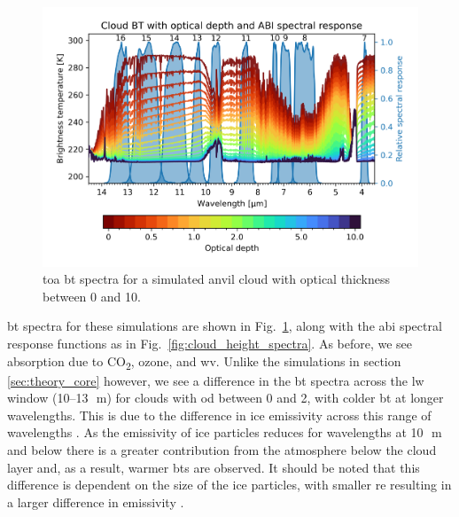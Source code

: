 \begin{figure}[tp]
    \includegraphics[width=\textwidth]{figures/chapter1_08.png}
    \caption[
    \acrshort{toa} \acrshort{bt} spectra for a simulated anvil cloud with optical thickness between 0 and 10
    ]{
    \acrshort{toa} \acrshort{bt} spectra for a simulated anvil cloud with optical thickness between 0 and 10. 
    }
    \label{fig:optical_depth_spectra}
\end{figure}

\acrshort{bt} spectra for these simulations are shown in Fig.~\ref{fig:optical_depth_spectra}, along with the \acrshort{abi} spectral response functions as in Fig.~\ref{fig:cloud_height_spectra}.
As before, we see absorption due to CO\textsubscript{2}, ozone, and \acrshort{wv}.
Unlike the simulations in section \ref{sec:theory_core} however, we see a difference in the \acrshort{bt} spectra across the \acrshort{lw} window (10--13\,\unit{\mu m}) for clouds with \acrshort{od} between 0 and 2, with colder \acrshort{bt} at longer wavelengths.
This is due to the difference in ice emissivity across this range of wavelengths \citep{fu_radiation_2015}.
As the emissivity of ice particles reduces for wavelengths at 10\,\unit{\mu m} and below there is a greater contribution from the atmosphere below the cloud layer and, as a result, warmer \acrshort{bt}s are observed.
It should be noted that this difference is dependent on the size of the ice particles, with smaller \acrshort{re} resulting in a larger difference in emissivity \citep{dubuisson_sensitivity_2008}.


